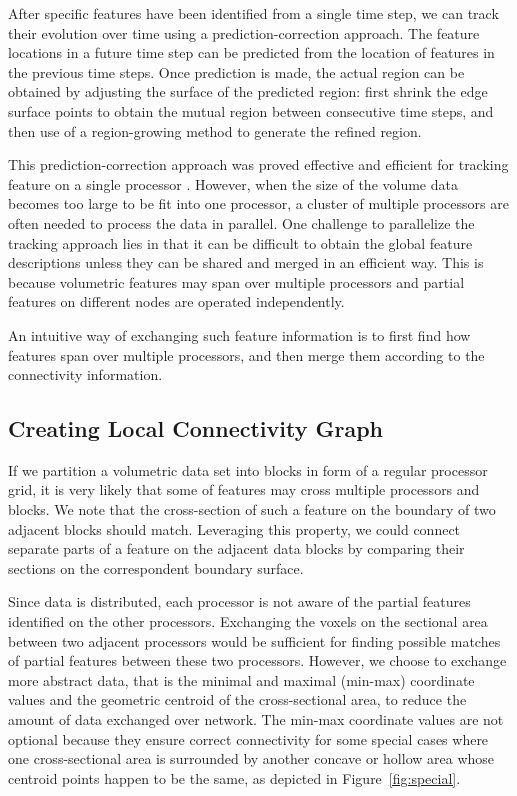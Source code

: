 \documentclass[10pt, conference, compsocconf]{IEEEtran}
\begin{document}
After specific features have been identified from a single time step, we can track their evolution over time using a prediction-correction approach. The feature locations in a future time step can be predicted from the location of features in the previous time steps. Once prediction is made, the actual region can be obtained by adjusting the surface of the predicted region: first shrink the edge surface points to obtain the mutual region between consecutive time steps, and then use of a region-growing method to generate the refined region.

This prediction-correction approach was proved effective and efficient for tracking feature on a single processor \cite{Muelder2009}. However, when the size of the volume data becomes too large to be fit into one processor, a cluster of multiple processors are often needed to process the data in parallel. One challenge to parallelize the tracking approach lies in that it can be difficult to obtain the global feature descriptions unless they can be shared and merged in an efficient way. This is because volumetric features may span over multiple processors and partial features on different nodes are operated independently.

An intuitive way of exchanging such feature information is to first find how features span over multiple processors, and then merge them according to the connectivity information.

\subsection{Creating Local Connectivity Graph}

If we partition a volumetric data set into blocks in form of a regular processor grid, it is very likely that some of features may cross multiple processors and blocks. We note that the cross-section of such a feature on the boundary of two adjacent blocks should match. Leveraging this property, we could connect separate parts of a feature on the adjacent data blocks by comparing their sections on the correspondent boundary surface.

Since data is distributed, each processor is not aware of the partial features identified on the other processors. Exchanging the voxels on the sectional area between two adjacent processors would be sufficient for finding possible matches of partial features between these two processors. However, we choose to exchange more abstract data, that is the minimal and maximal (min-max) coordinate values and the geometric centroid of the cross-sectional area, to reduce the amount of data exchanged over network. The min-max coordinate values are not optional because they ensure correct connectivity for some special cases where one cross-sectional area is surrounded by another concave or hollow area whose centroid points happen to be the same, as depicted in Figure~\ref{fig:special}.
\end{document}
